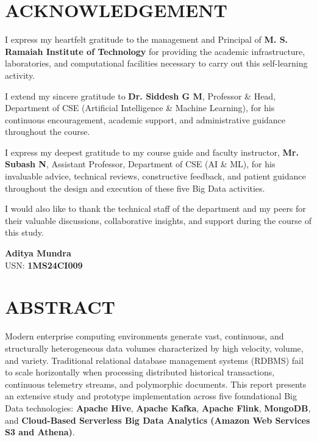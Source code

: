 \documentclass[12pt,a4paper]{report}
\newcommand{\StudentOne}{Aditya Mundra}
\newcommand{\USNOne}{1MS24CI009}
\newcommand{\GuideOne}{Mr. Subash N}
\newcommand{\GuideDesignation}{Assistant Professor}
\newcommand{\HOD}{Dr. Siddesh G M}
\begin{document}
\clearpage

\chapter*{ACKNOWLEDGEMENT}

I express my heartfelt gratitude to the management and Principal of \textbf{M. S. Ramaiah Institute of Technology} for providing the academic infrastructure, laboratories, and computational facilities necessary to carry out this self-learning activity.

I extend my sincere gratitude to \textbf{\HOD}, Professor \& Head, Department of CSE (Artificial Intelligence \& Machine Learning), for his continuous encouragement, academic support, and administrative guidance throughout the course.

I express my deepest gratitude to my course guide and faculty instructor, \textbf{\GuideOne}, \GuideDesignation, Department of CSE (AI \& ML), for his invaluable advice, technical reviews, constructive feedback, and patient guidance throughout the design and execution of these five Big Data activities.

I would also like to thank the technical staff of the department and my peers for their valuable discussions, collaborative insights, and support during the course of this study.

\vspace{1.5cm}
\begin{flushright}
\textbf{\StudentOne}\\
USN: \textbf{\USNOne}
\end{flushright}

\clearpage

\chapter*{ABSTRACT}

Modern enterprise computing environments generate vast, continuous, and structurally heterogeneous data volumes characterized by high velocity, volume, and variety. Traditional relational database management systems (RDBMS) fail to scale horizontally when processing distributed historical transactions, continuous telemetry streams, and polymorphic documents. This report presents an extensive study and prototype implementation across five foundational Big Data technologies: \textbf{Apache Hive}, \textbf{Apache Kafka}, \textbf{Apache Flink}, \textbf{MongoDB}, and \textbf{Cloud-Based Serverless Big Data Analytics (Amazon Web Services S3 and Athena)}.
\end{document}
